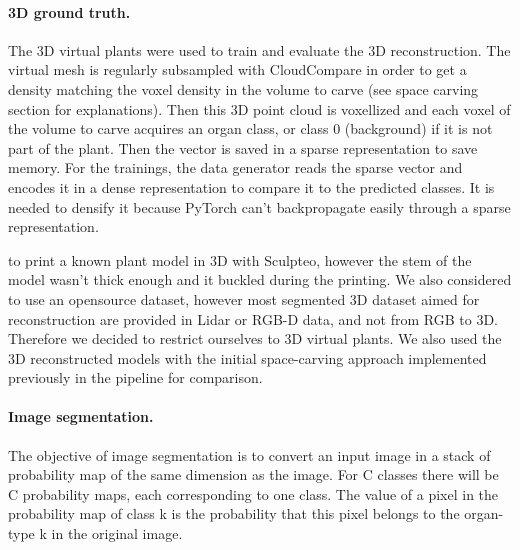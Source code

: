 

\paragraph{3D ground truth.} The 3D virtual plants were
used to train and evaluate the 3D reconstruction. The
virtual mesh is regularly subsampled with CloudCompare
\cite{girardeau-montaut_cloudcompare-open_2011} in order to get
a density matching the voxel density in the volume to carve (see
space carving section for explanations). Then this 3D point cloud is
voxellized and each voxel of the volume to carve acquires an organ
class, or class 0 (background) if it is not part of the plant. Then
the vector is saved in a sparse representation to save memory. For the
trainings, the data generator reads the sparse vector and encodes it
in a dense representation to compare it to the predicted classes. It
is needed to densify it because PyTorch can't backpropagate easily
through a sparse representation.

to print a known plant model in 3D with Sculpteo, however the stem of
the model wasn't thick enough and it buckled during the printing. We
also considered to use an opensource dataset, however most segmented 3D
dataset aimed for reconstruction are provided in Lidar or RGB-D data,
and not from RGB to 3D. Therefore we decided to restrict ourselves to
3D virtual plants. We also used the 3D reconstructed models with the
initial space-carving approach implemented previously in the pipeline
\cite{wintz_automated_nodate} for comparison.


\paragraph{Image segmentation.} The objective of image segmentation is
to convert an input image in a stack of probability map of the same
dimension as the image. For C classes there will be C probability
maps, each corresponding to one class. The value of a pixel in the
probability map of class k is the probability that this pixel belongs
to the organ-type k in the original image.


